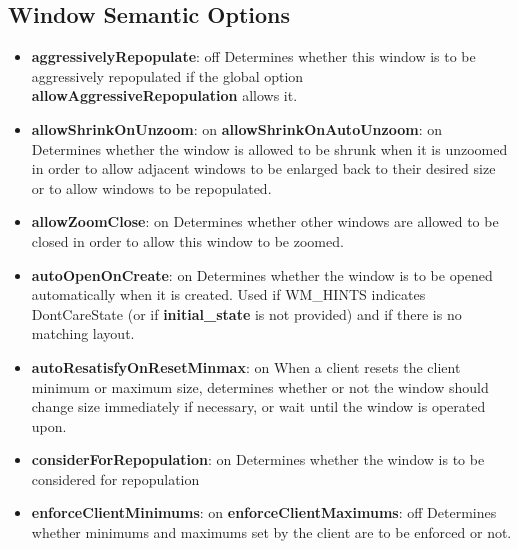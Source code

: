 \subsection{Window Semantic Options}

\begin{itemize}
\item {\bf aggressivelyRepopulate}: off\newline{}
Determines whether this window is to be aggressively repopulated
if the global option {\bf allowAggressiveRepopulation} allows it.

\item {\bf allowShrinkOnUnzoom}: on\newline{}
{\bf allowShrinkOnAutoUnzoom}: on\newline{}
Determines whether the window is allowed to be shrunk when it is
unzoomed in order to allow adjacent windows to be enlarged back
to their desired size or to allow windows to be repopulated.

\item {\bf allowZoomClose}: on\newline{}
Determines whether other windows are allowed to be closed in
order to allow this window to be zoomed.

\item {\bf autoOpenOnCreate}: on\newline{}
Determines whether the window is to be opened automatically when
it is created. Used if {\sc WM\_HINTS} indicates DontCareState (or if
{\bf initial\_state} is not provided) and if there is no matching layout.

\item {\bf autoResatisfyOnResetMinmax}: on\newline{}
When a client resets the client minimum or maximum size,
determines whether or not the window should change size
immediately if necessary, or wait until the window is operated
upon.

\item {\bf considerForRepopulation}: on\newline{}
Determines whether the window is to be considered for
repopulation

\item {\bf enforceClientMinimums}: on\newline{}
{\bf enforceClientMaximums}: off\newline{}
Determines whether minimums and maximums set by the client are to
be enforced or not.


\end{itemize}
